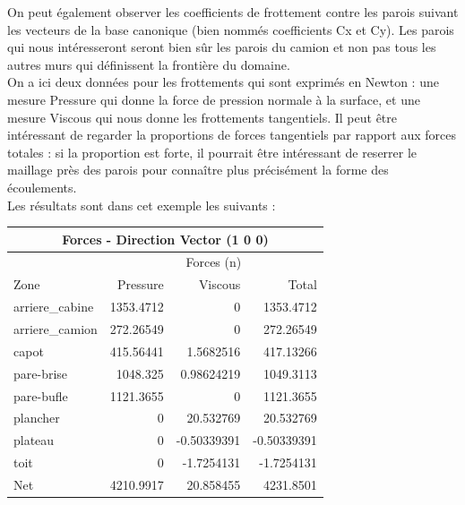 On peut également observer les coefficients de frottement contre les parois suivant les vecteurs de la base canonique (bien nommés coefficients Cx et Cy). Les parois qui nous intéresseront seront bien sûr les parois du camion et non pas tous les autres murs qui définissent la frontière du domaine. \\
On a ici deux données pour les frottements qui sont exprimés en Newton : une mesure Pressure qui donne la force de pression normale à la surface, et une mesure Viscous qui nous donne les frottements tangentiels. Il peut être intéressant de regarder la proportions de forces tangentiels par rapport aux forces totales : si la proportion est forte, il pourrait être intéressant de reserrer le maillage près des parois pour connaître plus précisément la forme des écoulements.\\
Les résultats sont dans cet exemple les suivants :
\begin{center}\begin{tabular}{|l|r r r|}
\hline
\multicolumn{4}{|c|}{Forces - Direction Vector (1 0 0)} \\
\hline
		&   \multicolumn{3}{c|}{Forces (n)} \\
\hline
Zone                &     Pressure    &   Viscous     &   Total      \\
\hline
arriere\_cabine      &     1353.4712   &   0           &   1353.4712  \\
arriere\_camion     &      272.26549   &   0           &   272.26549  \\ 
capot               &     415.56441    &  1.5682516    &  417.13266   \\
pare-brise          &     1048.325     &  0.98624219   &  1049.3113   \\
pare-bufle          &     1121.3655    &  0            &  1121.3655   \\
plancher            &     0            &  20.532769    &  20.532769   \\
plateau             &     0            &  -0.50339391  &  -0.50339391 \\
toit                &     0            &  -1.7254131   &  -1.7254131  \\
\hline
\hline
Net                 &     4210.9917    &  20.858455    &  4231.8501   \\
\hline
\end{tabular}\end{center}

